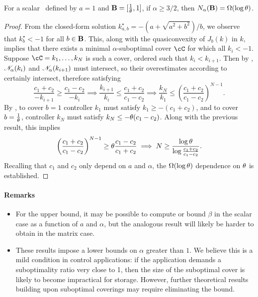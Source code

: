 \begin{theorem}
\label{thm:scalar-lb}
	For a scalar \DDFproblem\ defined by
	$a = 1$ and $\mathbf{B} = [\frac{1}{\theta}, 1]$,
	if $\alpha \geq 3 / 2$, %
	then
	$N_{\alpha}(\mathbf{B}) = \Omega(\log \theta)$.
\end{theorem}
\begin{proof}
	From the closed-form solution
	\(
		k^\star_{a,b} = -(a + \sqrt{a^2 + b^2})/b
	\),
	we observe that $k^\star_b < -1$ for all $b \in \mathbf{B}$.
	This, along with the quasiconvexity of $J_b(k)$ in $k$,
	implies that there exists a minimal $\alpha$-suboptimal cover $\coveringset$ for which all $k_i < -1$.
	Suppose $\coveringset = k_1, \dots, k_N$ is such a cover, ordered such that $k_i < k_{i+1}$.
	Then
	by ,
	$\mathscr{N}_{\alpha}(k_i)$
	and
	$\mathscr{N}_{\alpha}(k_{i+1})$
	must intersect,
	so their overestimates according to
	certainly intersect,
	therefore satisfying
	\[
		\frac{c_1 + c_2}{-k_{i+1}}
		\geq
		\frac{c_1 - c_2}{-k_i}
		\implies
		\frac{k_{i+1}}{k_i} \leq \frac{c_1 + c_2}{c_1 - c_2}
		\implies
		\frac{k_N}{k_1} \leq \left(\frac{c_1 + c_2}{c_1 - c_2}\right)^{N-1}.
	\]
	By ,
	to cover $b = 1$
	controller $k_1$ must satisfy
	$k_1 \geq -(c_1 + c_2)$,
	and to cover $b = \frac{1}{\theta}$,
	controller $k_N$ must satisfy
	$k_N \leq -\theta(c_1 - c_2)$.
	Along with the previous result, this implies
	\[
		\left(\frac{c_1 + c_2}{c_1 - c_2}\right)^{N-1}
		\geq
		\theta
		\frac{c_1 - c_2}{c_1 + c_2}
		\implies
		N \geq \frac{\log \theta}{\log \frac{c_1 + c_2}{c_1 - c_2}}.
	\]
	Recalling that $c_1$ and $c_2$ only depend on $a$ and $\alpha$,
	the $\Omega(\log \theta)$ dependence on $\theta$ is established.
\end{proof}

\paragraph{Remarks}
\begin{itemize}
	\item For the upper bound, it may be possible to compute or bound $\beta$ in the scalar case
		as a function of $a$ and $\alpha$,
		but the analogous result will likely be harder to obtain in the matrix case.
	\item These results impose a lower bounds on $\alpha$ greater than $1$.
		We believe this is a mild condition in control applications:
		if the application demands a suboptimality ratio very close to 1,
		then the size of the suboptimal cover is likely to become impractical for storage.
		However, further theoretical results building upon suboptimal coverings may require eliminating the bound.
\end{itemize}


